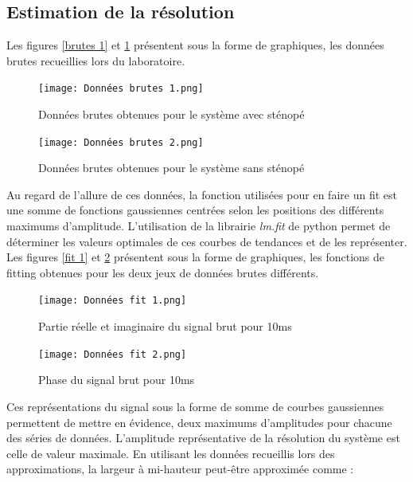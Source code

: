\documentclass[11pt,letterpaper]{article}
\begin{document}
\subsection{Estimation de la résolution}

Les figures \ref{brutes 1} et \ref{brutes 2} présentent sous la forme de graphiques, les données brutes recueillies lors du laboratoire. 

\begin{figure}[h!]
    \centering
    \begin{minipage}[t]{0.46\linewidth}
        \centering
        \texttt{[image: Données brutes 1.png]}
        \caption{Données brutes obtenues pour le système avec sténopé}
        \label{brutes 1}
    \end{minipage}\hfill
    \begin{minipage}[t]{0.5\linewidth}
        \centering
        \texttt{[image: Données brutes 2.png]}
        \caption{Données brutes obtenues pour le système sans sténopé}
        \label{brutes 2}
    \end{minipage}

\end{figure}

Au regard de l'allure de ces données, la fonction utilisées pour en faire un fit est une somme de fonctions gaussiennes centrées selon les positions des différents maximums d'amplitude. L'utilisation de la librairie \textit{lm.fit} de python permet de déterminer les valeurs optimales de ces courbes de tendances et de les représenter. Les figures \ref{fit 1} et \ref{fit 2} présentent sous la forme de graphiques, les fonctions de fitting obtenues pour les deux jeux de données brutes différents. 

\begin{figure}[h!]
    \centering
    \begin{minipage}[t]{0.46\linewidth}
        \centering
        \texttt{[image: Données fit 1.png]}
        \caption{Partie réelle et imaginaire du signal brut pour 10ms}
        \label{fit 1}
    \end{minipage}\hfill
    \begin{minipage}[t]{0.5\linewidth}
        \centering
        \texttt{[image: Données fit 2.png]}
        \caption{Phase du signal brut pour 10ms}
        \label{fit 2}
    \end{minipage}
\end{figure}

Ces représentations du signal sous la forme de somme de courbes gaussiennes permettent de mettre en évidence, deux maximums d'amplitudes pour chacune des séries de données. L'amplitude représentative de la résolution du système est celle de valeur maximale. En utilisant les données recueillis lors des approximations, la largeur à mi-hauteur peut-être approximée comme :
\end{document}
